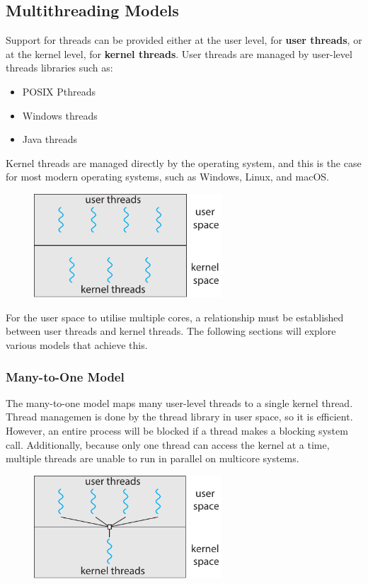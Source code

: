 \documentclass{article}
\begin{document}
\subsection{Multithreading Models}
Support for threads can be provided either at the user level, for
\textbf{user threads}, or at the kernel level, for \textbf{kernel
threads}. User threads are managed by user-level threads libraries such
as:
\begin{itemize}
    \item POSIX Pthreads
    \item Windows threads
    \item Java threads
\end{itemize}
Kernel threads are managed directly by the operating system, and this is
the case for most modern operating systems, such as Windows, Linux, and
macOS.
\begin{figure}[H]
    \centering
    \includegraphics[width = 7cm]{figures/threads_user_kernel.pdf}
\end{figure}
For the user space to utilise multiple cores, a relationship must be
established between user threads and kernel threads. The following
sections will explore various models that achieve this.
\subsubsection{Many-to-One Model}
The many-to-one model maps many user-level threads to a single kernel
thread. Thread managemen is done by the thread library in user space,
so it is efficient. However, an entire process will be blocked if a
thread makes a blocking system call. Additionally, because only one
thread can access the kernel at a time, multiple threads are unable to
run in parallel on multicore systems.
\begin{figure}[H]
    \centering
    \includegraphics[width = 7cm]{figures/threads_many_to_one.pdf}
\end{figure}
\end{document}

